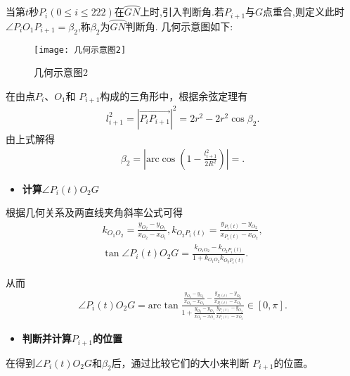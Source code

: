 \documentclass{cumcmthesis}
\begin{document}
\par 当第$t$秒$P_i(0\leq i\leq 222)$在$\wideparen{GN}$上时,引入判断角.若$P_{i+1}$与$G$点重合,则定义此时$\angle P_iO_1P_{i+1}=\beta_2$,称$\beta_2$为$\wideparen{GN}$判断角. 几何示意图如下:
\begin{figure}[!h]
    \centering
    \texttt{[image: 几何示意图2]}
    \caption{几何示意图2}
\end{figure}
\par 在由点$ P_{i}、O_{1} $和 $P_{i + 1} $构成的三角形中，根据余弦定理有
\begin{align}\label{1.........448}
l_{i+1}^{2}=\left| \overrightarrow{P_iP_{i+1}} \right|^2=2r^2-2r^2\cos \beta _2.
\end{align}
由上式解得
\begin{align}\label{1.........449}
\beta _2=\left| \mathrm{arc}\cos \left( 1-\frac{l_{i+1}^{2}}{2R^2} \right) \right|=.
\end{align}

\begin{itemize}
    \item \textbf{计算$\angle P_{i}(t)O_2G$}
    \end{itemize}

\par 根据几何关系及两直线夹角斜率公式可得
\begin{gather}\label{1.........450}
k_{O_1O_2}=\frac{y_{O_2}-y_{O_1}}{x_{O_2}-x_{O_1}},k_{O_2P_i\left( t \right)}=\frac{y_{P_i\left( t \right)}-y_{O_2}}{x_{P_i\left( t \right)}-x_{O_2}},
\\
\tan \angle P_i(t)O_2G=\frac{k_{O_1O_2}-k_{O_2P_i\left( t \right)}}{1+k_{O_1O_2}k_{O_2P_i\left( t \right)}}.
\end{gather}
\par 从而
\begin{align}\label{1.........451}
\angle P_i(t)O_2G=\mathrm{arc}\tan \frac{\frac{y_{O_2}-y_{O_1}}{x_{O_2}-x_{O_1}}-\frac{y_{P_i\left( t \right)}-y_{O_2}}{x_{P_i\left( t \right)}-x_{O_2}}}{1+\frac{y_{O_2}-y_{O_1}}{x_{O_2}-x_{O_1}}\frac{y_{P_i\left( t \right)}-y_{O_2}}{x_{P_i\left( t \right)}-x_{O_2}}}\in[0,\pi].
\end{align}
\begin{itemize}
    \item \textbf{判断并计算$P_{i+1}$的位置}
\end{itemize}
\par 在得到$\angle P_{i}(t)O_{2}G $和$\beta_{2} $后，通过比较它们的大小来判断 $P_{i + 1} $的位置。
 
\end{document}
